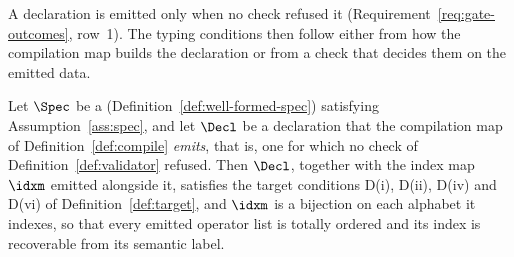 
A declaration is emitted only when no check refused it
(Requirement~\ref{req:gate-outcomes}, row~1). The typing conditions then
follow either from how the compilation map builds the declaration or from a
check that decides them on the emitted data.

\begin{theorem}\label{thm:typing}
Let $\Spec$ be a 
(Definition~\ref{def:well-formed-spec}) satisfying
Assumption~\ref{ass:spec}, and
let $\Decl$ be a declaration that the compilation map of Definition~\ref{def:compile}
\emph{emits}, that is, one for which no check of
Definition~\ref{def:validator} refused. Then $\Decl$, together with the index
map $\idxm$ emitted alongside it, satisfies the target conditions D(i), D(ii),
D(iv) and D(vi) of Definition~\ref{def:target}, and $\idxm$ is a bijection on
each alphabet it indexes, so that every emitted operator list is totally
ordered and its index is recoverable from its semantic label.
\end{theorem}

